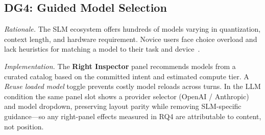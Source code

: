 \subsection{DG4: Guided Model Selection}

\textit{Rationale.}
The SLM ecosystem offers hundreds of models varying in quantization, context
length, and hardware requirement.
Novice users face choice overload and lack heuristics for matching a model
to their task and device~\cite{subramonyam2024gulf}.

\textit{Implementation.}
The \textbf{Right Inspector} panel recommends models from a curated catalog
based on the committed intent and estimated compute tier.
A \textit{Reuse loaded model} toggle prevents costly model reloads across
turns.
In the LLM condition the same panel slot shows a provider selector
(OpenAI / Anthropic) and model dropdown, preserving layout parity while
removing SLM-specific guidance---so any right-panel effects measured in RQ4
are attributable to content, not position.

